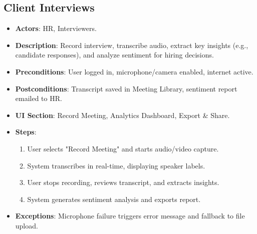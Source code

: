 \documentclass[12pt]{article}
\begin{document}
\subsection{Client Interviews}
\begin{itemize}
    \item \textbf{Actors}: HR, Interviewers.
    \item \textbf{Description}: Record interview, transcribe audio, extract key insights (e.g., candidate responses), and analyze sentiment for hiring decisions.
    \item \textbf{Preconditions}: User logged in, microphone/camera enabled, internet active.
    \item \textbf{Postconditions}: Transcript saved in Meeting Library, sentiment report emailed to HR.
    \item \textbf{UI Section}: Record Meeting, Analytics Dashboard, Export \& Share.
    \item \textbf{Steps}:
        \begin{enumerate}
            \item User selects "Record Meeting" and starts audio/video capture.
            \item System transcribes in real-time, displaying speaker labels.
            \item User stops recording, reviews transcript, and extracts insights.
            \item System generates sentiment analysis and exports report.
        \end{enumerate}
    \item \textbf{Exceptions}: Microphone failure triggers error message and fallback to file upload.
\end{itemize}
\end{document}
